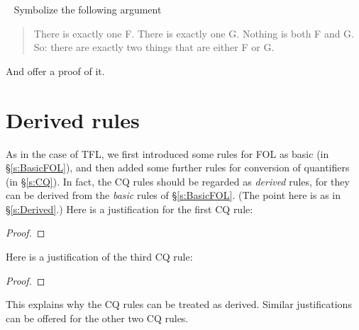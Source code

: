 \
\problempart
Symbolize the following argument
	\begin{quote}
		There is exactly one F. There is exactly one G. Nothing is both F and G. So: there are exactly two things that are either F or G.
	\end{quote}
And offer a proof of it.




\chapter{Derived rules}\label{s:DerivedFOL}
As in the case of TFL, we first introduced some rules for FOL as basic (in \S\ref{s:BasicFOL}), and then added some further rules for conversion of quantifiers (in \S\ref{s:CQ}). In fact, the CQ rules should be regarded as \emph{derived} rules, for they can be derived from the  \emph{basic} rules of \S\ref{s:BasicFOL}. (The point here is as in \S\ref{s:Derived}.) Here is a justification for the first CQ rule:
\begin{proof}
	\open
		\open
		\close
	\close
\end{proof}
Here is a justification of the third CQ rule:
\begin{proof}
	\open
		\open
		\close
	\close
\end{proof}
This explains why the CQ rules can be treated as derived. Similar justifications can be offered for the other two CQ rules. 

